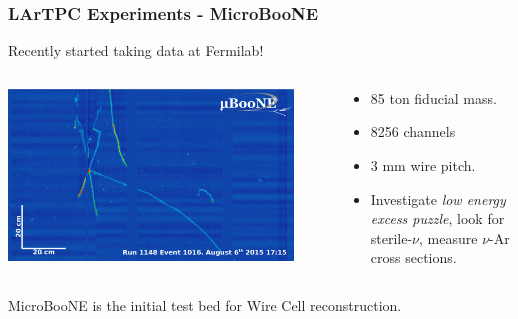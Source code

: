 \begin{frame}
  \frametitle{LArTPC Experiments - MicroBooNE}

  \begin{center}
    Recently started taking data at Fermilab!    
  \end{center}

  \begin{columns}
    \begin{column}{0.5\textwidth}
      \begin{center}
        \includegraphics[width=0.9\textwidth]{run1148_ev1016.png}
      \end{center}

    \end{column}
    \begin{column}{0.5\textwidth}
      \begin{itemize}
      \item 85 ton fiducial mass.
      \item 8256 channels
      \item 3 mm wire pitch.
      \item Investigate \textit{low energy excess puzzle}, look for sterile-$\nu$, measure $\nu$-Ar
        cross sections.
      \end{itemize}
    \end{column}
  \end{columns}


  \begin{center}
    MicroBooNE is the initial test bed for Wire Cell reconstruction.    
  \end{center}

\end{frame}

